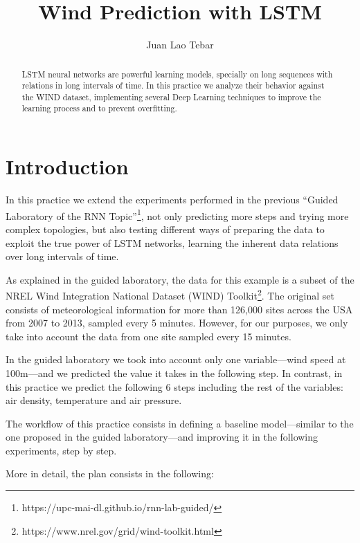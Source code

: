 \documentclass[]{article}
\title{Wind Prediction with LSTM}
\author{Juan Lao Tebar}
\begin{document}
	
\maketitle

\begin{abstract}
	
LSTM neural networks are powerful learning models, specially on long sequences with relations in long intervals of time. In this practice we analyze their behavior against the WIND dataset, implementing several Deep Learning techniques to improve the learning process and to prevent overfitting.
	
\end{abstract}

\section{Introduction}

In this practice we extend the experiments performed in the previous ``Guided Laboratory of the RNN Topic''\footnote{https://upc-mai-dl.github.io/rnn-lab-guided/}, not only predicting more steps and trying more complex topologies, but also testing different ways of preparing the data to exploit the true power of LSTM networks, learning the inherent data relations over long intervals of time.

As explained in the guided laboratory, the data for this example is a subset of the NREL Wind Integration National Dataset (WIND) Toolkit\footnote{https://www.nrel.gov/grid/wind-toolkit.html}. The original set consists of meteorological information for more than 126,000 sites across the USA from 2007 to 2013, sampled every 5 minutes. However, for our purposes, we only take into account the data from one site sampled every 15 minutes.

In the guided laboratory we took into account only one variable---wind speed at 100m---and we predicted the value it takes in the following step. In contrast, in this practice we predict the following 6 steps including the rest of the variables: air density, temperature and air pressure.

The workflow of this practice consists in defining a baseline model---similar to the one proposed in the guided laboratory---and improving it in the following experiments, step by step.

More in detail, the plan consists in the following:
\end{document}
